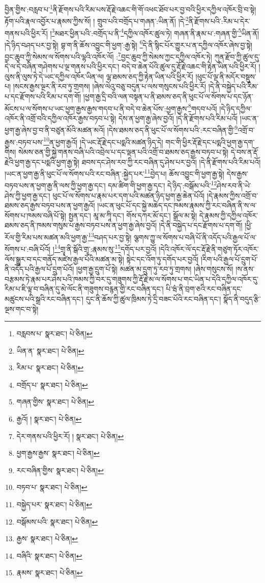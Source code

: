 བྱིན་གྱིས་:བརླབ་པ་\footnote{བརླབས་པ་  སྣར་ཐང་།  པེ་ཅིན། }ནི་རྫོགས་པའི་རིམ་པས་རྡོ་རྗེ་འཆང་གི་གོ་འཕང་ཐོབ་པར་བྱ་བའི་ཕྱིར་དཀྱིལ་འཁོར་བྲི་བ་སྟེ། རྟོག་པའི་རྣལ་འབྱོར་པ་རྣམས་ཀྱིས་སོ། །
གྲུབ་པའི་བགྲོད་པ་གཞན་:ཡིན་ནོ། །དེ་\footnote{ཡིན་ན་  སྣར་ཐང་།  པེ་ཅིན། }ནི་རྫོགས་པའི་:རིམ་པ་དེར་གནས་པའི་ཕྱིར་རོ། །\footnote{རིམ་པ་  སྣར་ཐང་།  པེ་ཅིན། }མཐར་ཕྱིན་པའི་:བགྲོད་པ་ནི་\footnote{བགྲོད་པ་  སྣར་ཐང་།  པེ་ཅིན། }དཀྱིལ་འཁོར་ཚུལ་ཏེ། གཞན་ནི་རྣམ་པ་:གཞན་གྱི་\footnote{གཞན་གྱིས་  སྣར་ཐང་།  པེ་ཅིན། }ཡིན་ནོ། །དེ་ཉིད་བཤད་པར་བྱ་སྟེ། བྷ་ག་ནི་ཆོས་འབྱུང་གི་ཕྱག་:རྒྱ་སྟེ། \footnote{རྒྱའོ། །   སྣར་ཐང་།  པེ་ཅིན། }དེ་ནི་སྙིང་པོར་གྱུར་པ་ན་དཀྱིལ་འཁོར་ཞེས་བྱ་སྟེ། བྱང་ཆུབ་ཀྱི་སེམས་ལ་སོགས་པའི་ལྷའི་འཁོར་ལོ། :\footnote{དེར་གནས་པའི་ཕྱིར་རོ། །  སྣར་ཐང་།  པེ་ཅིན། }བྱང་ཆུབ་ཀྱི་སེམས་ཀྱང་དཀྱིལ་འཁོར་ཏེ། ཀུན་རྫོབ་ཀྱི་ཚུལ་དུ་དེ་ལ་དེ་བཞིན་གཤེགས་པ་ལྔ་གནས་པའི་ཕྱིར་དང་། བདེ་བ་ཆེན་པོའི་ཚུལ་དུ་རྡོ་རྗེ་འཆང་གི་རྟེན་ཡིན་པའི་ཕྱིར་རོ། །ལུས་ནི་ལུས་ཏེ་དེ་ཡང་དཀྱིལ་འཁོར་ཡིན་ལ། ལྷ་ཐམས་ཅད་ཀྱི་རྟེན་ཡིན་པའི་ཕྱིར་རོ། །ཕུང་པོ་ལྔ་ནི་མདོར་བསྡུས་པ། །སངས་རྒྱས་ལྔར་ནི་རབ་ཏུ་གྲགས། །ཞེས་ལེའུ་བཅུ་བདུན་པ་ལས་གསུངས་པའི་ཕྱིར་རོ། །དེ་ནི་བསྐྱེད་པའི་རིམ་པ་དང་རྫོགས་པའི་རིམ་པ་དག་གོ། །ཕྱག་རྒྱ་དྲི་བའི་ལན་བསྟན་པ་ནི་ཐམས་ཅད་ནི་ཕུང་པོ་ལ་སོགས་པ་དང་ཉོན་མོངས་པ་ལ་སོགས་པ་ཡང་ཕྱག་རྒྱས་རྒྱས་གདབ་པ་ནི་བདེ་བ་ཆེན་པོས་:ཕྱག་རྒྱས་\footnote{ཕྱག་རྒྱས་རྒྱས་  སྣར་ཐང་།  པེ་ཅིན། }གདབ་པའོ། །དེ་ཉིད་དཀྱིལ་འཁོར་ནི་འགྲོ་བའི་དཀྱིལ་འཁོར་རྒྱས་བཏབ་པ་སྟེ། དེས་ན་ཕྱག་རྒྱ་ཞེས་བྱའོ། །དེ་ནི་རྫོགས་པའི་རིམ་པའོ། །ཡང་ན་ཕྱག་རྒྱ་ཞེས་བྱ་བ་ནི་བཙུན་མོའི་མཚན་མའོ། །དེས་ཐམས་ཅད་ནི་ཕུང་པོ་ལ་སོགས་པའི་:རང་བཞིན་གྱི་\footnote{རང་བཞིན་གྱིས་  སྣར་ཐང་།  པེ་ཅིན། }འགྲོ་བ་རྒྱས་:བཏབ་པས་\footnote{བཏབ་པ་  སྣར་ཐང་།  པེ་ཅིན། }ན་ཕྱག་རྒྱའོ། །དེ་ཡང་རྡོ་རྗེ་དང་པདྨའི་མཚན་ཉིད་དེ། གང་གི་ཕྱིར་རྡོ་རྗེ་དང་པདྨའི་ཕྱག་རྒྱ་དག་གིས། སེམས་ཅན་གྱི་སྐྱེ་གནས་བཞི་པའི་འབྲེལ་པ་དང་ལྡན་པའི་འགྲོ་བ་ཐམས་ཅད་རྒྱས་བཏབ་པ་སྟེ། དེ་བས་ན་རྡོ་རྗེའི་ཕྱག་རྒྱ་དང་པདྨའི་ཕྱག་རྒྱ་སྟེ། ཐབས་དང་ཤེས་རབ་ཀྱི་རང་བཞིན་དུ་ཤེས་པར་བྱའོ། །དེ་ནི་རྫོགས་པའི་རིམ་པའོ། །ཡང་ན་ཕྱག་རྒྱ་ནི་ཕུང་པོ་ལ་སོགས་པའི་རང་བཞིན་:སྐྱེད་པར་\footnote{བསྐྱེད་པར་  སྣར་ཐང་།  པེ་ཅིན། }བྱེད་པ། ཆོས་འབྱུང་གི་ཕྱག་རྒྱ་སྟེ། དེས་རྒྱས་བཏབ་པས་ན་ཕྱག་རྒྱ་ནི་ལས་ཀྱི་ཕྱག་རྒྱ་དང་། དམ་ཚིག་གི་ཕྱག་རྒྱ་དང་། དེ་ཉིད་:བསྒོམ་པའི་\footnote{བསྒོམས་པའི་  སྣར་ཐང་།  པེ་ཅིན། }ཤེས་རབ་ནི་ཡེ་ཤེས་ཀྱི་ཕྱག་རྒྱ་དང་། ཕུང་པོ་ལ་སོགས་པ་རྣམ་པར་དག་པའི་མཚན་ཉིད་ཕྱག་རྒྱ་ཆེན་པོའོ། །དེ་རྣམས་ཀྱིས་འགྲོ་བ་ཐམས་ཅད་རྒྱས་བཏབ་པས་ན་ཕྱག་རྒྱའོ། །ཡང་ན་ཕུང་པོ་དང་སྐྱེ་མཆེད་དང་ཁམས་རྣམས་ཀྱི་རང་བཞིན་ནི་ས་ལ་སོགས་པ་ཁམས་བཞི་པོ་སྟེ། སྤྱན་དང་། མཱ་མ་ཀཱི་དང་། གོས་དཀར་མོ་དང་། སྒྲོལ་མ་སྟེ། དེ་རྣམས་ཀྱི་དཀྱིལ་འཁོར་ཐམས་ཅད་ནི་ཁམས་གསུམ་པ་རྒྱས་བཏབ་པས་ན་ཕྱག་རྒྱ་ཞེས་བྱའོ། །དེ་ནི་བསྐྱེད་པ་དང་རྫོགས་པ་དག་གོ། །ཕྱི་རོལ་གྱི་རིམ་པས་མཚན་མའི་ཕྱག་རྒྱ་\footnote{རྒྱས་  སྣར་ཐང་།  པེ་ཅིན། }བཤད་པར་བྱ་སྟེ། ལྕགས་ཀྱུ་ལ་སོགས་པ་བཞི་པོ་ནི་འདོད་པའི་རྒྱལ་པོ་ལ་སོགས་པ་:བཞི་པོའོ། །\footnote{བཞིའི་  སྣར་ཐང་།  པེ་ཅིན། }གྲྭ་ནི་སྒོའི་གྲྭ་:རྣམས་སུ་\footnote{རྣམས་  སྣར་ཐང་།  པེ་ཅིན། }དགོད་པར་བྱའོ། །དེའི་འཁོར་ལོ་དང་རྡོ་རྗེ་ནི་གཙུག་ཏོར་འཁོར་ལོས་སྒྱུར་བ་དང་གནོད་མཛེས་རྒྱལ་པོའི་མཚན་མ་སྟེ། སྟེང་དང་འོག་ཏུ་དགོད་པར་བྱའོ། །རིག་པའི་རྒྱལ་པོ་དྲུག་པོ་ནི་འདོད་པའི་རྒྱལ་པོ་དྲུག་པོའོ། །ཕྱག་རྒྱ་དྲུག་པོ་སྟེ། མཚན་མ་དྲུག་ཏུ་རབ་ཏུ་གྲགས། །ཞེས་གསུངས་སོ། །ས་ནས་བརྩམས་ཏེ་རྣམ་པར་ཤེས་པའི་ཁམས་ཀྱི་བར་དུ་གཟུགས་ཀྱི་རྡོ་རྗེ་མ་ལ་སོགས་པ་གང་ཡིན་པ་དེའི་དཀྱིལ་འཁོར་དུ་རིམ་པ་ཇི་ལྟ་བ་བཞིན་དུ་མེ་ལོང་ནི་གཟུགས་བརྙན་གྱི་རང་བཞིན་དང་། པི་ཝཾ་ནི་བྲག་ཅའི་རང་བཞིན་དང་མཚུངས་པའི་སྒྲའི་རང་བཞིན་དང་། དུང་ནི་ཆོས་ཀྱི་ཚུལ་ཁྲིམས་ཏེ་དྲི་བཟང་པོའི་རང་བཞིན་དང་། སྣོད་ནི་བདུད་རྩི་ལྔས་གང་བ་སྟེ། 